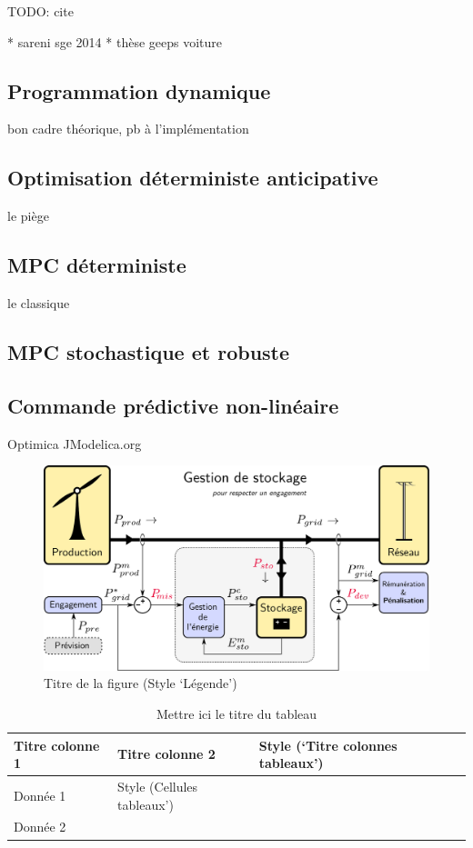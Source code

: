 \documentclass[a4paper,10pt,twocolumn]{article}
\begin{document}
TODO: cite

* sareni sge 2014
* thèse geeps voiture

\subsection{Programmation dynamique}
bon cadre théorique,
pb à l'implémentation

\subsection{Optimisation déterministe anticipative}
le piège

\subsection{MPC déterministe}
le classique

\subsection{MPC stochastique et robuste}


\subsection{Commande prédictive non-linéaire}

Optimica JModelica.org \cite{Akesson:2010:CCE}

\begin{figure}[!ht]
	\begin{center}
		\includegraphics[width=0.6\columnwidth]{figures/wind_storage.pdf}
	\end{center}
	
	\caption{Titre de la figure (Style ‘Légende’)}
	\label{fig_1}
\end{figure}

\begin{table}[!h]
	\caption{Mettre ici le titre du tableau}
	
	\begin{center}
		\begin{tabular}{|>{\footnotesize}L{1.4cm}|>{\footnotesize}L{1.5cm}|>{\footnotesize}L{2.4cm}|>{\footnotesize}L{2.1cm}|}
			\hline
			\textbf{Titre colonne 1} & \textbf{Titre colonne 2} & \textbf{Style (‘Titre colonnes tableaux’)} & \textbf{} \\
			\hline
			Donnée 1 & Style (Cellules tableaux’) & & \\
			\hline
			Donnée 2 & & & \\
			\hline
		\end{tabular}
	\end{center}
	
	\label{tab_1}
\end{table}
\end{document}
